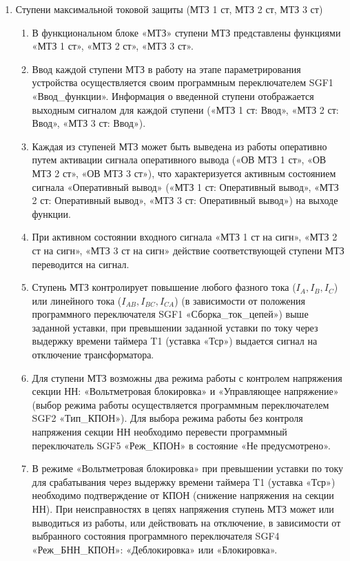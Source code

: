 \begin{enumerate}

\item Ступени максимальной токовой защиты (МТЗ 1 ст, МТЗ 2 ст, МТЗ 3 ст)

\begin{enumerate}

\item
В функциональном блоке «МТЗ» ступени МТЗ представлены функциями «МТЗ 1 ст», «МТЗ 2 ст», «МТЗ 3 ст».

\item
Ввод каждой ступени МТЗ в работу на этапе параметрирования устройства осуществляется своим программным переключателем SGF1 «Ввод\_функции». Информация о введенной ступени отображается выходным сигналом для каждой ступени («МТЗ 1 ст: Ввод», «МТЗ 2 ст: Ввод», «МТЗ 3 ст: Ввод»).

\item
Каждая из ступеней МТЗ может быть выведена из работы оперативно путем активации сигнала оперативного вывода («ОВ МТЗ 1 ст», «ОВ МТЗ 2 ст», «ОВ МТЗ 3 ст»), что характеризуется активным состоянием сигнала «Оперативный вывод» («МТЗ 1 ст: Оперативный вывод», «МТЗ 2 ст: Оперативный вывод», «МТЗ 3 ст: Оперативный вывод») на выходе функции.

\item
При активном состоянии входного сигнала «МТЗ 1 ст на сигн», «МТЗ 2 ст на сигн», «МТЗ 3 ст на сигн» действие соответствующей ступени МТЗ переводится на сигнал.

\item
Ступень МТЗ контролирует повышение любого фазного тока ($I_A, I_B, I_C$) или линейного тока ($I_{AB}, I_{BC}, I_{CA}$) (в зависимости от положения программного переключателя SGF1 «Сборка\_ток\_цепей») выше заданной уставки, при превышении заданной уставки по току через выдержку времени таймера T1 (уставка «Тср») выдается сигнал на отключение трансформатора. 

\item\sloppy
Для ступени МТЗ возможны два режима работы с контролем напряжения секции НН: «Вольтметровая блокировка» и «Управляющее напряжение» (выбор режима работы осуществляется программным переключателем SGF2 «Тип\_КПОН»). Для выбора режима работы без контроля напряжения секции НН необходимо перевести программный переключатель SGF5 «Реж\_КПОН» в состояние «Не предусмотрено».

\item
В режиме «Вольтметровая блокировка» при превышении уставки по току для срабатывания через выдержку времени таймера T1 (уставка «Тср») необходимо подтверждение от КПОН (снижение напряжения на секции НН). При неисправностях в цепях напряжения ступень МТЗ может или выводиться из работы, или действовать на отключение, в зависимости от выбранного состояния программного переключателя SGF4 «Реж\_БНН\_КПОН»: «Деблокировка» или «Блокировка». 


\end{enumerate}
\end{enumerate}
